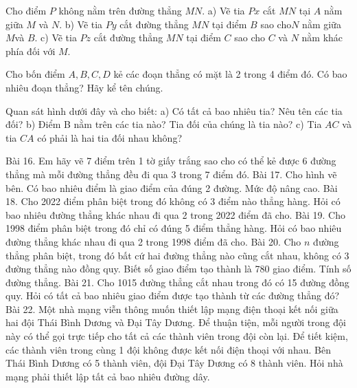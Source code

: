 \begin{bt}
	Cho điểm $P$ không nằm trên đường thẳng $MN$.
	a) Vẽ tia $Px$ cắt $MN$ tại $A$ nằm giữa $M$ và $N$.
	b) Vẽ tia $Py$ cắt đường thẳng $MN$ tại điểm $B$ sao cho$ N$ nằm giữa $M $và $B$.
	c) Vẽ tia $Pz$ cắt đường thẳng $MN$ tại điểm $C$ sao cho $C$ và $N$ nằm khác phía đối với $M$.
	\begin{loigiaichuong}
		
	\end{loigiaichuong}
\end{bt}
\begin{bt}
	Cho bốn điểm $A,B,C,D$ kẻ các đoạn thẳng có mặt là 2 trong 4 điểm đó. Có bao nhiêu đoạn thẳng? Hãy kể tên chúng.
	\begin{loigiaichuong}
		
	\end{loigiaichuong}
\end{bt}
\begin{bt}
	Quan sát hình dưới đây và cho biết:
	a) Có tất cả bao nhiêu tia? Nêu tên các tia đối?
	b) Điểm B nằm trên các tia nào? Tia đối của chúng là tia nào?
	c) Tia $AC$ và tia $CA$ có phải là hai tia đối nhau không?
	\begin{loigiaichuong}
		
	\end{loigiaichuong}
\end{bt}
Bài 16. Em hãy vẽ 7 điểm trên 1 tờ giấy trắng sao cho có thể kẻ được 6 đường thẳng mà mỗi đường thẳng đều đi qua 3 trong 7 điểm đó. 
Bài 17. Cho hình vẽ bên. Có bao nhiêu điểm là giao điểm của đúng 2 đường.
Mức độ nâng cao.
Bài 18. Cho 2022 điểm phân biệt trong đó không có 3 điểm nào thẳng hàng. Hỏi có bao nhiêu đường thẳng khác nhau đi qua 2 trong 2022 điểm đã cho.
Bài 19. Cho 1998 điểm phân biệt trong đó chỉ có đúng 5 điểm thẳng hàng. Hỏi có bao nhiêu đường thẳng khác nhau đi qua 2 trong 1998 điểm đã cho.
Bài 20. Cho $n$ đường thẳng phân biệt, trong đó bất cứ hai đường thẳng nào cũng cắt nhau, không có 3 đường thẳng nào đồng quy. Biết số giao điểm tạo thành là 780 giao điểm. Tính số đường thẳng.
Bài 21. Cho 1015 đường thẳng cắt nhau trong đó có 15 đường đồng quy. Hỏi có tất cả bao nhiêu giao điểm được tạo thành từ các đường thẳng đó?
Bài 22. Một nhà mạng viễn thông muốn thiết lập mạng điện thoại kết nối giữa hai đội Thái Bình Dương và Đại Tây Dương. Để thuận tiện, mỗi người trong đội này có thể gọi trực tiếp cho tất cả các thành viên trong đội còn lại. Để tiết kiệm, các thành viên trong cùng 1 đội không được kết nối điện thoại với nhau. Bên Thái Bình Dương có 5 thành viên, đội Đại Tây Dương có 8 thành viên. Hỏi nhà mạng phải thiết lập tất cả bao nhiêu đường dây.

